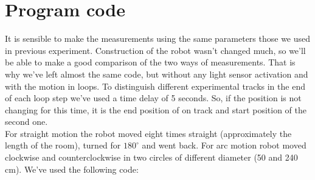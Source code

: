 \documentclass[a4paper, 12pt]{article}
\begin{document}
\section{Program code}

It is sensible to make the measurements using the same parameters those we used in previous experiment. Construction of the robot wasn't changed much, so we'll be able to make a good comparison of the two ways of measurements. That is why we've left almost the same code, but without any light sensor activation and with the motion in loops. To distinguish different experimental tracks in the end of each loop step we've used a time delay of 5 seconds. So, if the position is not changing for this time, it is the end position of on track and start position of the second one. \\
For straight motion the robot moved eight times straight (approximately the length of the room), turned for  $180^{\circ}$ and went back. For arc motion robot moved clockwise and counterclockwise in two circles of different diameter (50 and 240 cm). We've used the following code:
\end{document}
